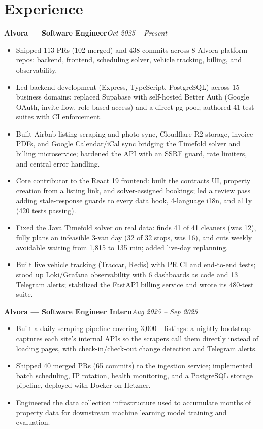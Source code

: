 \documentclass[10pt,a4paper]{article}
\newcommand{\entry}[2]{\textbf{#1}\hfill\textit{#2}\par}
\begin{document}
\section*{Experience}
\entry{Alvora --- Software Engineer}{Oct 2025 -- Present}
\begin{itemize}
\item Shipped 113 PRs (102 merged) and 438 commits across 8 Alvora platform repos: backend, frontend, scheduling solver, vehicle tracking, billing, and observability.
\item Led backend development (Express, TypeScript, PostgreSQL) across 15 business domains; replaced Supabase with self-hosted Better Auth (Google OAuth, invite flow, role-based access) and a direct pg pool; authored 41 test suites with CI enforcement.
\item Built Airbnb listing scraping and photo sync, Cloudflare R2 storage, invoice PDFs, and Google Calendar/iCal sync bridging the Timefold solver and billing microservice; hardened the API with an SSRF guard, rate limiters, and central error handling.
\item Core contributor to the React 19 frontend: built the contracts UI, property creation from a listing link, and solver-assigned bookings; led a review pass adding stale-response guards to every data hook, 4-language i18n, and a11y (420 tests passing).
\item Fixed the Java Timefold solver on real data: finds 41 of 41 cleaners (was 12), fully plans an infeasible 3-van day (32 of 32 stops, was 16), and cuts weekly avoidable waiting from 1,815 to 135 min; added live-day replanning.
\item Built live vehicle tracking (Traccar, Redis) with PR CI and end-to-end tests; stood up Loki/Grafana observability with 6 dashboards as code and 13 Telegram alerts; stabilized the FastAPI billing service and wrote its 480-test suite.
\end{itemize}
\entry{Alvora --- Software Engineer Intern}{Aug 2025 -- Sep 2025}
\begin{itemize}
\item Built a daily scraping pipeline covering 3,000+ listings: a nightly bootstrap captures each site's internal APIs so the scrapers call them directly instead of loading pages, with check-in/check-out change detection and Telegram alerts.
\item Shipped 40 merged PRs (65 commits) to the ingestion service; implemented batch scheduling, IP rotation, health monitoring, and a PostgreSQL storage pipeline, deployed with Docker on Hetzner.
\item Engineered the data collection infrastructure used to accumulate months of property data for downstream machine learning model training and evaluation.
\end{itemize}
\end{document}
